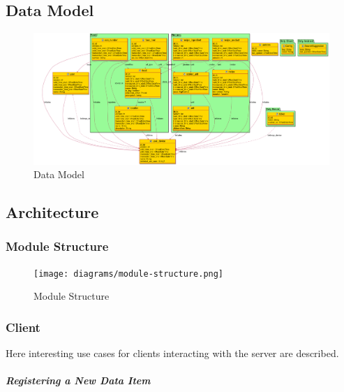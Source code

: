\documentclass{memoir}
\begin{document}
\chapter{}
\section{Data Model}

\begin{figure}[!ht]
\includegraphics[width=\linewidth]{diagrams/data-model.png}
\caption{Data Model}
\end{figure}

\section{Architecture}

\subsection{Module Structure}

\begin{figure}[!ht]
\texttt{[image: diagrams/module-structure.png]}
\caption{Module Structure}
\end{figure}

\subsection{Client}

Here interesting use cases for clients interacting with the server are
described.

\paragraph{Registering a New Data Item\\}
\end{document}
